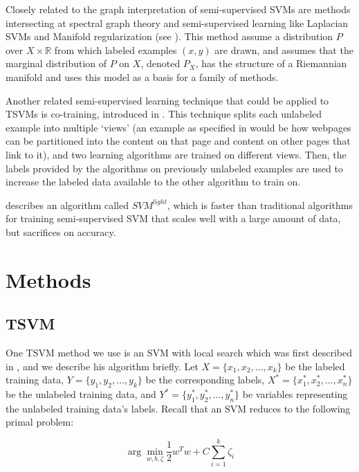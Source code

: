\documentclass[11pt]{article}
\begin{document}
Closely related to the graph interpretation of semi-supervised SVMs
are methods intersecting at spectral graph theory and semi-supervised
learning like Laplacian SVMs and Manifold regularization
(see \cite{belkin2005manifold}). This method assume a distribution $P$
over $X\times \mathbb{R}$ from which labeled examples $(x,y)$ are drawn,
and assumes that the marginal distribution of $P$ on $X$, denoted $P_X$,
has the structure of a Riemannian manifold and uses this model
as a basis for a family of methods.

Another related semi-supervised learning technique that could
be applied to TSVMs is co-training, introduced in
\cite{blum1998combining}. This technique splits each unlabeled
example into multiple `views' (an example as specified in \cite{blum1998combining} would be how webpages can be partitioned into
the content on that page and content on other pages that link to it),
and two learning algorithms are trained on different views. Then,
the labels provided by the algorithms on previously unlabeled examples
are used to increase the labeled data available to the other
algorithm to train on.

\cite{joachims1999making} describes an algorithm called $SVM^{light}$,
which is faster than traditional algorithms for training
semi-supervised SVM that scales well with a large amount of
data, but sacrifices on accuracy.

\section{Methods}

\subsection{TSVM}

One TSVM method we use is an SVM with local search which was first described in \cite{Joachims:1999}, and we describe his algorithm briefly. Let $X = \{x_1, x_2, \ldots, x_k\}$ be the labeled training data, $Y = \{y_1, y_2, \ldots, y_k\}$ be the corresponding labels, $X^* = \{x^*_1, x^*_2, \ldots, x^*_n\}$ be the unlabeled training data, and $Y^* = \{y^*_1, y^*_2, \ldots, y^*_n\}$ be variables representing the unlabeled training data's labels. Recall that an SVM reduces to the following primal problem:

\begin{equation}\label{eq:1}
\arg\min_{w, b, \zeta} \frac{1}{2}w^Tw+C\sum_{i=1}^k\zeta_i
\end{equation}
\end{document}
